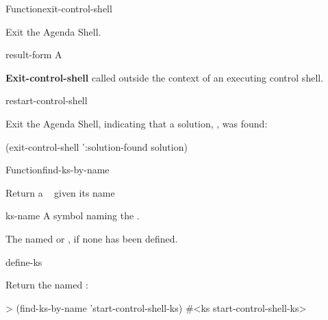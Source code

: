 \documentclass[10pt,twoside,english,pdftex]{article}
\begin{document}
\begin{functiondoc}{Function}{exit-control-shell}{
 \superstar}
%
%
%
%

\fnsyntax

\fnpurpose Exit the Agenda Shell.

\fnpackage {}

\fnmodule {}

\fnargs
\begin{args}{result-form}
 A 
\end{args}

\fnerrors \textbf{Exit-control-shell} called outside the context of an
executing control shell.

\begin{alsos}{restart-control-shell}
\end{alsos}

\fnexample Exit the Agenda Shell, indicating that a solution, 
, was found:
\begin{example}
  (exit-control-shell ':solution-found solution)
\end{example}

\end{functiondoc}

 
\begin{functiondoc}{Function}{find-ks-by-name}{ 
  \returns{} }
%

\fnsyntax

\fnpurpose Return a ~  given its name

\fnpackage {}

\fnmodule {}

\fnargs
\begin{args}{ks-name}
\arg[ks-name] A symbol naming the .
\end{args}

\fnreturns The   named 
or \nil, if none has been defined.

\begin{alsos}{define-ks}
\also[define-ks]
\also[ks]
\end{alsos}

\fnexample Return the  named :
\begin{example}
> (find-ks-by-name 'start-control-shell-ks)
#<ks start-control-shell-ks>
\end{example}

\end{functiondoc}
\end{document}
